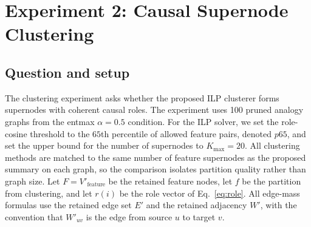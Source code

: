 \documentclass[../main.tex]{subfiles}
\begin{document}
\begin{table}[ht]
\centering
\caption{Pruning results on 100 BATS analogy graphs at edge retained-mass
threshold $0.95$ and node retained-mass threshold $0.02$. Values are means
across graphs. Irrelevant feature and token counts are the numbers of retained
feature and input-token nodes at irrelevant positions (lower is better);
graph completeness and replacement score are the graph-faithfulness metrics of
Eq.~\eqref{eq:metric-completeness} and Eq.~\eqref{eq:metric-replacement} (higher
is better). The best value in each column is in bold and the second-best value
is underlined; the $\alpha=1.0$ baseline ignores token weights, so its
normalization is not applicable.}
\label{tab:pruning-results}
\end{table}

\section{Experiment 2: Causal Supernode Clustering}
\label{sec:clustering-experiment}
\label{sec:baselines}

\subsection{Question and setup}

The clustering experiment asks whether the proposed ILP clusterer forms
supernodes with coherent causal roles. The experiment uses 100 pruned analogy
graphs from the entmax $\alpha=0.5$ condition. For the ILP solver, we set the
role-cosine threshold to the $65$th percentile of allowed feature pairs, denoted
$p65$, and set the upper bound for the number of supernodes to $K_{\max}=20$.
All clustering methods are
matched to the same number of feature supernodes as the proposed summary on each
graph, so the comparison isolates partition quality rather than graph size. Let
$F = V'_{\text{feature}}$ be the retained feature nodes, let $f$ be the
partition from clustering, and let $r(i)$ be the role vector of
Eq.~\eqref{eq:role}. All edge-mass formulas use the retained edge set $E'$ and
the retained adjacency $W'$, with the convention that $W'_{uv}$ is the edge from
source $u$ to target $v$.
\end{document}
